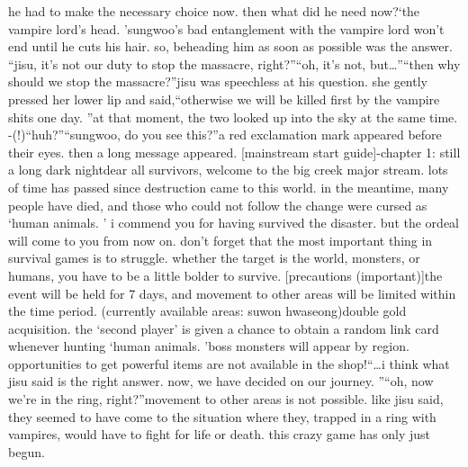  he had to make the necessary choice now.
 then what did he need now?‘the vampire lord’s head.
’sungwoo’s bad entanglement with the vampire lord won’t end until he cuts his hair.
so, beheading him as soon as possible was the answer.
“jisu, it’s not our duty to stop the massacre, right?”“oh, it’s not, but…”“then why should we stop the massacre?”jisu was speechless at his question.
 she gently pressed her lower lip and said,“otherwise we will be killed first by the vampire shits one day.
”at that moment, the two looked up into the sky at the same time.
-(!)“huh?”“sungwoo, do you see this?”a red exclamation mark appeared before their eyes.
 then a long message appeared.
[mainstream start guide]-chapter 1: still a long dark nightdear all survivors, welcome to the big creek major stream.
 lots of time has passed since destruction came to this world.
 in the meantime, many people have died, and those who could not follow the change were cursed as ‘human animals.
’ i commend you for having survived the disaster.
 but the ordeal will come to you from now on.
 don’t forget that the most important thing in survival games is to struggle.
 whether the target is the world, monsters, or humans, you have to be a little bolder to survive.
[precautions (important)]the event will be held for 7 days, and movement to other areas will be limited within the time period.
 (currently available areas: suwon hwaseong)double gold acquisition.
the ‘second player’ is given a chance to obtain a random link card whenever hunting ‘human animals.
’boss monsters will appear by region.
 opportunities to get powerful items are not available in the shop!“…i think what jisu said is the right answer.
 now, we have decided on our journey.
”“oh, now we’re in the ring, right?”movement to other areas is not possible.
 like jisu said, they seemed to have come to the situation where they, trapped in a ring with vampires, would have to fight for life or death.
this crazy game has only just begun.


